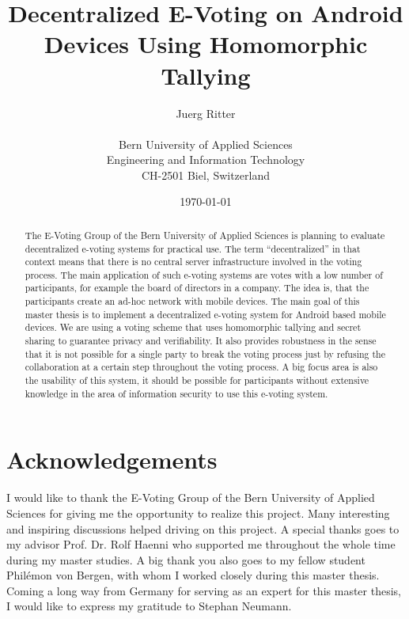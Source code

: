 \documentclass[numbers=noenddot, abstract=on, a4paper, headsepline,
footsepline, oneside, draft=off]{scrreprt}
\begin{document}
\title{\bf Decentralized E-Voting on Android Devices Using Homomorphic Tallying}
\subject{Master Thesis}
\author{Juerg Ritter\\
\\
Bern University of Applied Sciences\\
Engineering and Information Technology\\
CH-2501 Biel, Switzerland\\
}
\date{\today}
\publishers{Advisor:\\
Prof. Dr. Rolf Haenni, Bern University of Applied Sciences\\
\bigskip
Expert:\\
Stephan Neumann, Technical University of Darmstadt}
\maketitle

\makenomenclature

\clearpage
{}

\begin{abstract}
The E-Voting Group of the Bern University of Applied Sciences is planning to
evaluate decentralized e-voting systems for practical use. The term
``decentralized'' in that context means that there is no central server
infrastructure involved in the voting process. The main application of such
e-voting systems are votes with a low number of participants, for example the
board of directors in a company. The idea is, that the participants create an
ad-hoc network with mobile devices. The main goal of this master thesis is to
implement a decentralized e-voting system for Android based mobile devices. We
are using a voting scheme that uses homomorphic tallying and secret sharing to
guarantee privacy and verifiability. It also provides robustness in the sense
that it is not possible for a single party to break the voting process just by
refusing the collaboration at a certain step throughout the voting process. A
big focus area is also the usability of this system, it should be possible for
participants without extensive knowledge in the area of information security to
use this e-voting system.
\end{abstract}

\tableofcontents
\listoffigures
\listoftables

\chapter*{Acknowledgements} I would like to thank the E-Voting Group of the Bern
University of Applied Sciences for giving me the opportunity to realize this
project. Many interesting and inspiring discussions helped driving on this
project. A special thanks goes to my advisor Prof. Dr. Rolf Haenni who supported
me throughout the whole time during my master studies. A big thank you also goes
to my fellow student Philémon von Bergen, with whom I worked closely during this
master thesis. Coming a long way from Germany for serving as an expert for this
master thesis, I would like to express my gratitude to Stephan Neumann.
\end{document}
